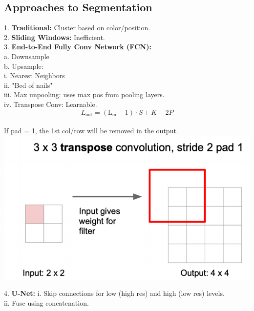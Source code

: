 \subsection{Approaches to Segmentation}
1. \textbf{Traditional:} Cluster based on color/position. \\
2. \textbf{Sliding Windows:} Inefficient. \\
3. \textbf{End-to-End Fully Conv Network (FCN):}  \\
   a. Downsample\\
   b. Upsample: \\
   i.  Nearest Neighbors \\
   ii. "Bed of nails" \\
   iii. Max unpooling: uses max pos from pooling layers. \\
   iv. Transpose Conv: Learnable. \\
      \[
      L_{\text{out}} = (\text{L}_{\text{in}} - 1) \cdot S + K - 2P
      \] \\
      If pad = 1, the 1st col/row will be removed in the output. \\
      \includegraphics[width=0.8\linewidth]{images/trans-conv.png}

      
4. \textbf{U-Net:}  
      i. Skip connections for low (high res) and high (low res) levels. \\
      ii. Fuse using concatenation.
